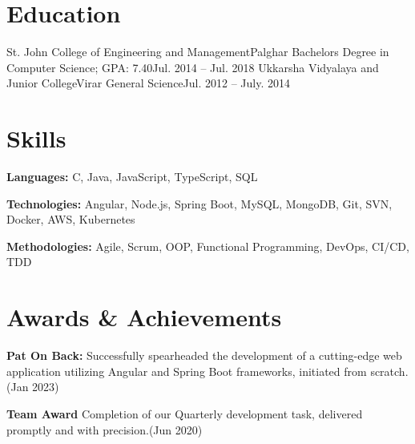 \documentclass{resume}
\begin{document}

\resumeItemListEnd

\resumeSubHeadingListEnd

\section{Education}
  \resumeSubHeadingListStart
    \resumeSubheading
      {St. John College of Engineering and Management}{Palghar}
      {Bachelors Degree in Computer Science;  GPA: 7.40}{Jul. 2014 -- Jul. 2018}
    \resumeSubheading
      {Ukkarsha Vidyalaya and Junior College}{Virar}
      {General Science}{Jul. 2012 -- July. 2014}
  \resumeSubHeadingListEnd




\section{Skills}
  \vspace{2pt}
  \resumeSubHeadingListStart
    \small{\item{
        
        \textbf{Languages:}{ C, Java, JavaScript, TypeScript, SQL} \\ \vspace{3pt}
        
        \textbf{Technologies:}{ Angular, Node.js, Spring Boot, MySQL, MongoDB, Git, SVN, Docker, AWS, Kubernetes} \\ \vspace{3pt}
        
        \textbf{Methodologies:}{ Agile, Scrum, OOP, Functional Programming, DevOps, CI/CD, TDD} \\ \vspace{3pt}
        
    }}
  \resumeSubHeadingListEnd


\section{Awards \& Achievements}
  \vspace{2pt}
  \resumeSubHeadingListStart
    \small{\item{
        \textbf{Pat On Back:}{ Successfully spearheaded the development of a cutting-edge web application utilizing Angular and Spring Boot frameworks, initiated from scratch.(Jan 2023)} \\ \vspace{3pt}

        \textbf{Team Award}{ Completion of our Quarterly development task, delivered promptly and with precision.(Jun 2020)} \\ \vspace{3pt}
        
    }}
  \resumeSubHeadingListEnd
\end{document}
